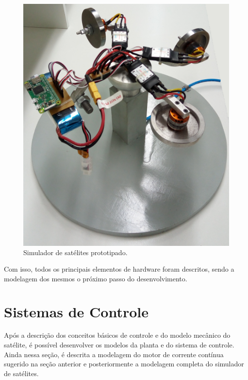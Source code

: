 \begin{figure}[H]
  \caption{Simulador de satélites prototipado.}
  \begin{center}
      \includegraphics[scale=.65]{metodologia/img/simulador_real}
  \end{center}
  \label{fig:simulador_real}
\end{figure}

Com isso, todos os principais elementos de hardware foram descritos, sendo a modelagem dos mesmos o próximo passo do desenvolvimento.



\section{Sistemas de Controle}

Após a descrição dos conceitos básicos de controle e do modelo mecânico do satélite, é possível desenvolver os modelos da planta e do sistema de controle. Ainda nessa seção, é descrita a modelagem do motor de corrente contínua sugerido na seção anterior e posteriormente a modelagem completa do simulador de satélites.


